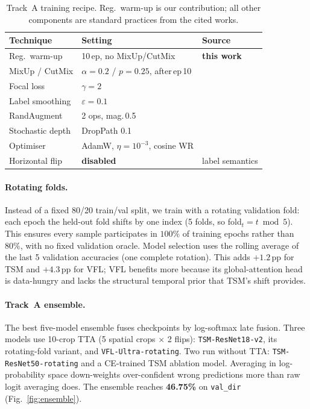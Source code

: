 \documentclass[10pt,twocolumn,letterpaper]{article}
\begin{document}
\begin{table}[t]
\centering\small
\setlength{\tabcolsep}{4pt}
\begin{tabular}{@{}lll@{}}
\toprule
Technique & Setting & Source \\
\midrule
Reg.\ warm-up      & 10\,ep, no MixUp/CutMix & \textbf{this work} \\
MixUp / CutMix     & $\alpha{=}0.2$ / $p{=}0.25$, after\,ep\,10 & \cite{zhang2018mixup,yun2019cutmix} \\
Focal loss         & $\gamma{=}2$ & \cite{lin2017focal} \\
Label smoothing    & $\varepsilon{=}0.1$ & \cite{muller2019labelsmooth} \\
RandAugment        & 2 ops, mag.\,0.5 & \cite{cubuk2020randaugment} \\
Stochastic depth   & DropPath 0.1 & \cite{huang2016stochdepth} \\
Optimiser          & AdamW, $\eta{=}10^{-3}$, cosine WR & \cite{loshchilov2019adamw} \\
Horizontal flip    & \textbf{disabled} & label semantics \\
\bottomrule
\end{tabular}
\caption{Track~A training recipe. Reg.\ warm-up is our contribution; all other
components are standard practices from the cited works.}
\label{tab:recipe}
\end{table}

\paragraph{Rotating folds.}
Instead of a fixed 80/20 train/val split, we train with a rotating validation
fold: each epoch the held-out fold shifts by one index (5 folds, so fold$_t =
t \bmod 5$). This ensures every sample participates in $100\%$ of training epochs
rather than $80\%$, with no fixed validation oracle. Model selection uses the
rolling average of the last 5 validation accuracies (one complete rotation).
This adds $+1.2$\,pp for TSM and $+4.3$\,pp for VFL; VFL benefits more
because its global-attention head is data-hungry and lacks the structural
temporal prior that TSM's shift provides.

\paragraph{Track~A ensemble.}
The best five-model ensemble fuses checkpoints by log-softmax late fusion.
Three models use 10-crop TTA (5 spatial crops $\times$ 2 flips):
\texttt{TSM-ResNet18-v2}, its rotating-fold variant, and
\texttt{VFL-Ultra-rotating}. Two run without TTA:
\texttt{TSM-ResNet50-rotating} and a CE-trained TSM ablation model.
Averaging in log-probability space down-weights over-confident wrong predictions
more than raw logit averaging does. The ensemble reaches \textbf{46.75\%} on
\texttt{val\_dir} (Fig.~\ref{fig:ensemble}).
\end{document}
